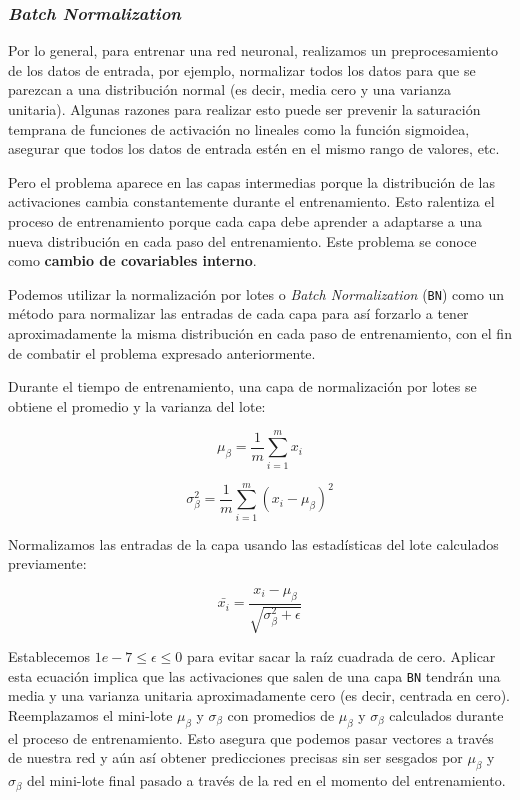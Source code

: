 \documentclass[a4paper,12pt]{article}
\begin{document}
\subsubsection{\textit{Batch Normalization}}


Por lo general, para entrenar una red neuronal, realizamos un preprocesamiento de los datos de entrada, por ejemplo, normalizar todos los datos para que se parezcan a una distribución normal (es decir, media cero y una varianza unitaria). Algunas razones para realizar esto puede ser prevenir la saturación temprana de funciones de activación no lineales como la función sigmoidea, asegurar que todos los datos de entrada estén en el mismo rango de valores, etc. \citep{bn}

Pero el problema aparece en las capas intermedias porque la distribución de las activaciones cambia constantemente durante el entrenamiento. Esto ralentiza el proceso de entrenamiento porque cada capa debe aprender a adaptarse a una nueva distribución en cada paso del entrenamiento. Este problema se conoce como \textbf{cambio de covariables interno}.

Podemos utilizar la normalización por lotes o \textit{Batch Normalization} (\texttt{BN}) como un método para normalizar las entradas de cada capa para así forzarlo a tener aproximadamente la misma distribución en cada paso de entrenamiento, con el fin de combatir el problema expresado anteriormente.

Durante el tiempo de entrenamiento, una capa de normalización por lotes se obtiene el promedio y la varianza del lote:

$$ \mu_{\beta} = \frac{1}{m} \sum_{i=1}^m x_i $$

$$ \sigma_{\beta}^2 = \frac{1}{m}  \sum_{i=1}^m (x_i - \mu_{\beta} ) ^2$$

Normalizamos las entradas de la capa usando las estadísticas del lote calculados previamente:

$$ \bar{x_i} = \frac{x_i - \mu_{\beta}}{\sqrt{\sigma_{\beta}^2+\epsilon}} $$



Establecemos $1e-7 \leq \epsilon \leq 0$ para evitar sacar la raíz cuadrada de cero. Aplicar esta ecuación implica que las activaciones que salen de una capa \texttt{BN} tendrán una media y una varianza unitaria aproximadamente cero (es decir, centrada en cero).
Reemplazamos el mini-lote $\mu_{\beta}$ y $\sigma_{\beta}$ con promedios de $\mu_{\beta}$ y $\sigma_{\beta}$ calculados durante el proceso de entrenamiento. Esto asegura que podemos pasar vectores a través de nuestra red y aún así obtener predicciones precisas sin ser sesgados por $\mu_{\beta}$ y $\sigma_{\beta}$ del mini-lote final pasado a través de la red en el momento del entrenamiento. 
\end{document}
